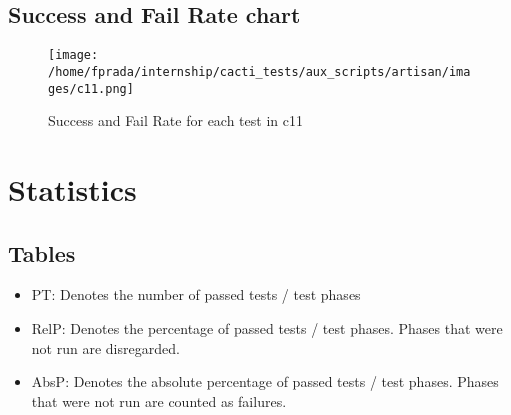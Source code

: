 \documentclass{article}
\begin{document}
\subsection{Success and Fail Rate chart}
\begin{figure}[h!]
\centering
\texttt{[image: /home/fprada/internship/cacti\_tests/aux\_scripts/artisan/images/c11.png]}
\caption{Success and Fail Rate for each test in c11}
\label{fig:c11}
\end{figure}
\newpage
\section{Statistics}\subsection{Tables}
\begin{itemize}
            \item PT: Denotes the number of passed tests / test phases
            \item RelP: Denotes the percentage of passed tests / test phases. Phases that were not run are disregarded.
            \item AbsP: Denotes the absolute percentage of passed tests / test phases. Phases that were not run are counted as failures.
            \end{itemize}
\end{document}
